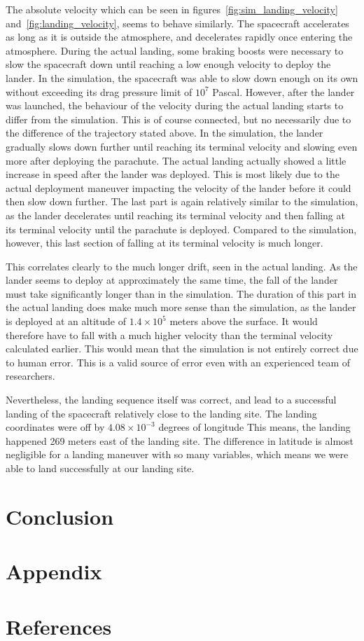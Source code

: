 \documentclass[reprint,english,notitlepage]{revtex4-2}
\begin{document}
The absolute velocity which can be seen in figures~\ref{fig:sim_landing_velocity} and~\ref{fig:landing_velocity}, seems to behave similarly.
The spacecraft accelerates as long as it is outside the atmosphere, and decelerates rapidly once entering the atmosphere.
During the actual landing, some braking boosts were necessary to slow the spacecraft down until reaching a low enough velocity to deploy the lander.
In the simulation, the spacecraft was able to slow down enough on its own without exceeding its drag pressure limit of $10^7$ Pascal.
However, after the lander was launched, the behaviour of the velocity during the actual landing starts to differ from the simulation.
This is of course connected, but no necessarily due to the difference of the trajectory stated above.
In the simulation, the lander gradually slows down further until reaching its terminal velocity and slowing even more after deploying the parachute.
The actual landing actually showed a little increase in speed after the lander was deployed.
This is most likely due to the actual deployment maneuver impacting the velocity of the lander before it could then slow down further.
The last part is again relatively similar to the simulation, as the lander decelerates until reaching its terminal velocity and then falling at its terminal velocity until the parachute is deployed.
Compared to the simulation, however, this last section of falling at its terminal velocity is much longer.

This correlates clearly to the much longer drift, seen in the actual landing.
As the lander seems to deploy at approximately the same time, the fall of the lander must take significantly longer than in the simulation.
The duration of this part in the actual landing does make much more sense than the simulation, as the lander is deployed at an altitude of $1.4 \times 10^5$ meters above the surface.
It would therefore have to fall with a much higher velocity than the terminal velocity calculated earlier.
This would mean that the simulation is not entirely correct due to human error.
This is a valid source of error even with an experienced team of researchers.

Nevertheless, the landing sequence itself was correct, and lead to a successful landing of the spacecraft relatively close to the landing site.
The landing coordinates were off by $4.08 \times 10^{-3}$ degrees of longitude
This means, the landing happened 269 meters east of the landing site.
The difference in latitude is almost negligible for a landing maneuver with so many variables, which means we were able to land successfully at our landing site.


\section{Conclusion} \label{sec:conclusion}


\section{Appendix} \label{sec:appendix}


\section*{References} \label{sec:references}
\end{document}
